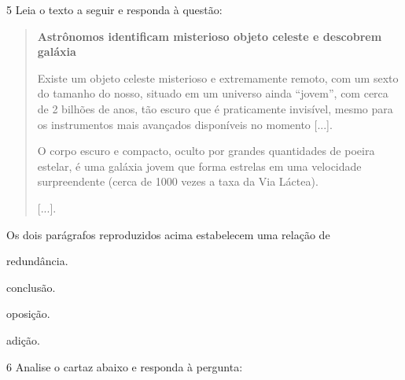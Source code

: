 \num{5} Leia o texto a seguir e responda à questão:

\begin{quote}
\textbf{Astrônomos identificam misterioso objeto celeste e descobrem
galáxia}

Existe um objeto celeste misterioso e extremamente remoto, com um
sexto do tamanho do nosso, situado em um universo ainda ``jovem'', com
cerca de 2 bilhões de anos, tão escuro que é praticamente invisível,
mesmo para os instrumentos mais avançados disponíveis no momento
{[}...{]}.

O corpo escuro e compacto, oculto por grandes quantidades de poeira
estelar, é uma galáxia jovem que forma estrelas em uma velocidade
surpreendente (cerca de 1000 vezes a taxa da Via Láctea).

{[}...{]}.
\end{quote}

Os dois parágrafos reproduzidos acima estabelecem uma relação de

\begin{escolha}
\item redundância.

\item conclusão.

\item oposição.

\item adição.
\end{escolha}


\num{6} Analise o cartaz abaixo e responda à pergunta:



